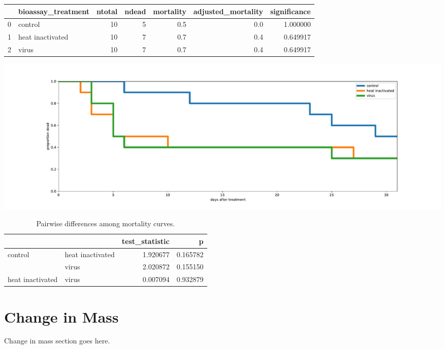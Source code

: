 \documentclass[11pt]{scrartcl}
\begin{document}
\begin{tabular}{llrrrrr}
\toprule
{} & bioassay\_treatment &  ntotal &  ndead &  mortality &  adjusted\_mortality &  significance \\
\midrule
0 &            control &      10 &      5 &        0.5 &                 0.0 &      1.000000 \\
1 &   heat inactivated &      10 &      7 &        0.7 &                 0.4 &      0.649917 \\
2 &              virus &      10 &      7 &        0.7 &                 0.4 &      0.649917 \\
\bottomrule
\end{tabular}


\begin{center}
     \includegraphics[width=\textwidth]{survivorshipfig.pdf}
\end{center}



    \begin{table}[h!]
    \centering
    \caption{Pairwise differences among mortality curves.}
\begin{tabular}{llrr}
\toprule
                 &       &  test\_statistic &         p \\
\midrule
control & heat inactivated &        1.920677 &  0.165782 \\
                 & virus &        2.020872 &  0.155150 \\
heat inactivated & virus &        0.007094 &  0.932879 \\
\bottomrule
\end{tabular}
\end{table} 

\clearpage
\section{Change in Mass}
Change in mass section goes here.
\end{document}
